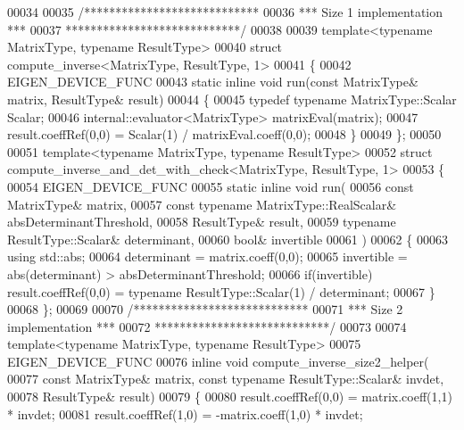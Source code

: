 \begin{DoxyCode}
00034 
00035 \textcolor{comment}{/****************************}
00036 \textcolor{comment}{*** Size 1 implementation ***}
00037 \textcolor{comment}{****************************/}
00038 
00039 \textcolor{keyword}{template}<\textcolor{keyword}{typename} MatrixType, \textcolor{keyword}{typename} ResultType>
00040 \textcolor{keyword}{struct }compute\_inverse<MatrixType, ResultType, 1>
00041 \{
00042   EIGEN\_DEVICE\_FUNC
00043   \textcolor{keyword}{static} \textcolor{keyword}{inline} \textcolor{keywordtype}{void} run(\textcolor{keyword}{const} MatrixType& matrix, ResultType& result)
00044   \{
00045     \textcolor{keyword}{typedef} \textcolor{keyword}{typename} MatrixType::Scalar Scalar;
00046     internal::evaluator<MatrixType> matrixEval(matrix);
00047     result.coeffRef(0,0) = Scalar(1) / matrixEval.coeff(0,0);
00048   \}
00049 \};
00050 
00051 \textcolor{keyword}{template}<\textcolor{keyword}{typename} MatrixType, \textcolor{keyword}{typename} ResultType>
00052 \textcolor{keyword}{struct }compute\_inverse\_and\_det\_with\_check<MatrixType, ResultType, 1>
00053 \{
00054   EIGEN\_DEVICE\_FUNC
00055   \textcolor{keyword}{static} \textcolor{keyword}{inline} \textcolor{keywordtype}{void} run(
00056     \textcolor{keyword}{const} MatrixType& matrix,
00057     \textcolor{keyword}{const} \textcolor{keyword}{typename} MatrixType::RealScalar& absDeterminantThreshold,
00058     ResultType& result,
00059     \textcolor{keyword}{typename} ResultType::Scalar& determinant,
00060     \textcolor{keywordtype}{bool}& invertible
00061   )
00062   \{
00063     \textcolor{keyword}{using} std::abs;
00064     determinant = matrix.coeff(0,0);
00065     invertible = abs(determinant) > absDeterminantThreshold;
00066     \textcolor{keywordflow}{if}(invertible) result.coeffRef(0,0) = \textcolor{keyword}{typename} ResultType::Scalar(1) / determinant;
00067   \}
00068 \};
00069 
00070 \textcolor{comment}{/****************************}
00071 \textcolor{comment}{*** Size 2 implementation ***}
00072 \textcolor{comment}{****************************/}
00073 
00074 \textcolor{keyword}{template}<\textcolor{keyword}{typename} MatrixType, \textcolor{keyword}{typename} ResultType>
00075 EIGEN\_DEVICE\_FUNC 
00076 \textcolor{keyword}{inline} \textcolor{keywordtype}{void} compute\_inverse\_size2\_helper(
00077     \textcolor{keyword}{const} MatrixType& matrix, \textcolor{keyword}{const} \textcolor{keyword}{typename} ResultType::Scalar& invdet,
00078     ResultType& result)
00079 \{
00080   result.coeffRef(0,0) =  matrix.coeff(1,1) * invdet;
00081   result.coeffRef(1,0) = -matrix.coeff(1,0) * invdet;

\end{DoxyCode}
